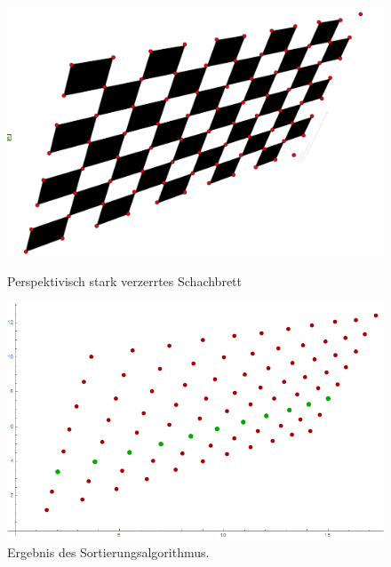 \begin{figure}[!htb]
	\includegraphics[width=\linewidth]{images/perspektivisch.png}
	\caption[perspektivisch startk verzerrtes Schachbrett]{Perspektivisch stark verzerrtes Schachbrett}
	\label{fig:Extreme3}
	\endminipage\hfill
	\includegraphics[width=\linewidth]{images/AlgPerspektifisch.png}
	\caption[Sortierte Punkte eines perspektivisch verzerrten Schachbretts]{Ergebnis des Sortierungsalgorithmus.}
	\label{fig:Extreme4}
	\endminipage\hfill
\end{figure}


